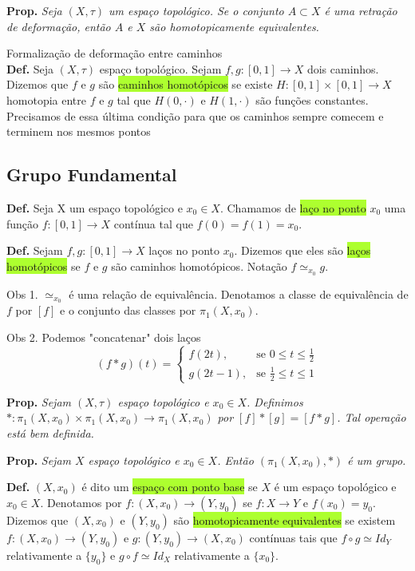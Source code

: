 \documentclass{article}
\begin{document}
\begin{landscape}
\begin{multicols}{3}
\medskip

\textbf{Prop.} \textit{Seja \( (X, \tau) \) um espaço topológico. Se o conjunto \( A \subset X \) é uma retração de deformação, então \( A \) e \( X \) são homotopicamente equivalentes.}\medskip

\colorbox{cinza}{Formalização de deformação entre caminhos}\\
\textbf{Def.} Seja \( (X, \tau) \) espaço topológico. Sejam \( f, g : [0,1] \to X \) dois caminhos. Dizemos que \( f \) e \( g \) são \colorbox{GreenYellow}{caminhos homotópicos} se existe \( H : [0,1] \times [0,1] \to X \) homotopia entre \( f \) e \( g \) tal que \( H(0, \cdot) \) e \( H(1, \cdot) \) são funções constantes.
\color{blue!70}Precisamos de essa última condição para que os caminhos sempre comecem e terminem nos mesmos pontos \color{black}
\subsection{Grupo Fundamental}
\textbf{Def.} Seja X um espaço topológico e $x_0 \in X$. Chamamos de \colorbox{GreenYellow}{laço no ponto} $x_0$ uma função $f:[0,1]\to X$ contínua tal que $f(0)=f(1)=x_0$.\medskip

\textbf{Def.} Sejam $f,g: [0,1] \to X$ laços no ponto $x_0$. Dizemos que eles são \colorbox{GreenYellow}{laços homotópicos} se $f$ e $g$ são caminhos homotópicos. \color{gray}Notação $f\simeq_{x_0} g$.\medskip

Obs 1. $\simeq_{x_0}$ é uma relação de equivalência. Denotamos a classe de equivalência de $f$ por $[f]$ e o conjunto das classes por $\pi_{1}(X,x_0)$.\medskip

Obs 2. Podemos "concatenar" dois laços
\begin{equation}
(f * g)(t) = \begin{cases}
f(2t), & \text{se } 0 \leq t \leq \frac{1}{2} \\
g(2t - 1), & \text{se } \frac{1}{2} \leq t \leq 1
\end{cases}
\end{equation}\color{black}

\textbf{Prop.} \textit{Sejam $(X, \tau)$ espaço topológico e $x_0 \in X$. Definimos $* : \pi_1(X, x_0) \times \pi_1(X, x_0) \to \pi_1(X, x_0)$ por $[f] * [g] = [f * g]$. Tal operação está bem definida.} \medskip

\textbf{Prop.} \textit{Sejam $X$ espaço topológico e $x_0\in X$. Então $(\pi_1(X, x_0), *)$ é um grupo.} \medskip

\textbf{Def.} $(X, x_0)$ é dito um \colorbox{GreenYellow}{espaço com ponto base} se $X$ é um espaço topológico e $x_0 \in X$. Denotamos por $f : (X, x_0) \rightarrow (Y, y_0)$ se $f : X \rightarrow Y$ e $f(x_0) = y_0$. Dizemos que $(X, x_0)$ e $(Y, y_0)$ são \colorbox{GreenYellow}{homotopicamente equivalentes} se existem $f : (X, x_0) \rightarrow (Y, y_0)$ e $g : (Y, y_0) \rightarrow (X, x_0)$ contínuas tais que $f \circ g \simeq Id_Y$ relativamente a $\{y_0\}$ e $g \circ f \simeq Id_X$ relativamente a $\{x_0\}$.


\end{multicols}
\end{landscape}
\end{document}
